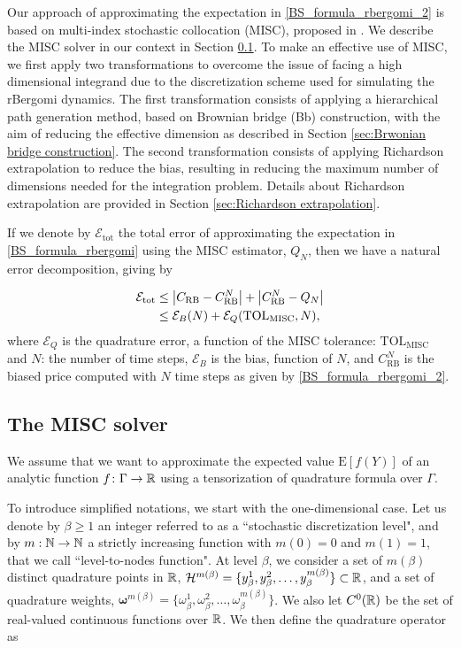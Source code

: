 Our approach of approximating the expectation in \eqref{BS_formula_rbergomi_2} is based on multi-index stochastic collocation (MISC), proposed in \cite{haji2016multi}. We describe the  MISC solver in our context in Section \ref{sec:Details of the MISC}.  To make an effective use of MISC, we  first apply two transformations to overcome the issue of facing a high dimensional integrand due to the discretization scheme used for simulating the rBergomi dynamics. The first transformation consists of applying a hierarchical  path generation method, based on Brownian
bridge (Bb) construction, with the aim of reducing the effective dimension as  described  in Section \ref{sec:Brwonian bridge construction}. The second transformation consists of applying Richardson extrapolation to reduce the bias, resulting in reducing  the maximum number of dimensions needed for the integration problem. Details about  Richardson extrapolation  are provided in Section \ref{sec:Richardson extrapolation}.




If we denote by $\mathcal{E}_{\text{tot}}$ the total error of approximating the  expectation in \eqref{BS_formula_rbergomi} using the MISC estimator, $Q_N$, then we have a natural error decomposition, giving by
 
\begin{align}\label{eq:total_error}
\mathcal{E}_{\text{tot}} & \le \left\lvert C_{\text{RB}}-C_{\text{RB}}^N\right\rvert+\left\lvert C_{\text{RB}}^N-Q_{N}\right\rvert\nonumber\\
  & \le \mathcal{E}_B(N)+ \mathcal{E}_Q(\text{TOL}_{\text{MISC}},N),
\end{align}
where  $\mathcal{E}_Q$ is the quadrature error, a function of the MISC tolerance:  $\text{TOL}_{\text{MISC}}$ and $N$: the number of time steps, $\mathcal{E}_B$  is the bias, function of $N$, and $C_{\text{RB}}^N$ is the biased price computed with $N$ time steps as given by \eqref{BS_formula_rbergomi_2}.

\subsection{The MISC solver}\label{sec:Details of the MISC}

We assume that we want to approximate the expected value $\text{E}[f(Y)]$ of an analytic function $f\colon \Gamma \to \mathbb{R}$ using a tensorization of quadrature formula over $\Gamma$.

To introduce simplified notations, we start with the one-dimensional case. Let us denote by $\beta \geq 1$ an integer referred to as a ``stochastic discretization level", and by $m: \mathbb{N} \rightarrow \mathbb{N}$  a strictly increasing function with $m(0)=0$ and $m(1)=1$, that we call  ``level-to-nodes function". At level $\beta$, we consider a set of $m(\beta)$ distinct quadrature points in $\mathbb{R}$, $\mathcal{H}^{m(\beta)}=\{y^1_\beta,y^2_\beta,\dots,y_\beta^{m(\beta)}\} \subset \mathbb{R}$, and a set of quadrature weights, $\boldsymbol{\omega}^{m(\beta)}=\{\omega^1_\beta,\omega^2_\beta,\dots,\omega_\beta^{m(\beta)}\}$. We also let $C^0(\mathbb{R})$ be the set of real-valued continuous functions over $\mathbb{R}$. We then define the quadrature operator as


